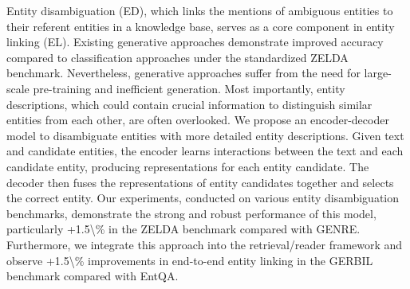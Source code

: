 Entity disambiguation (ED), which links the mentions of ambiguous entities to their referent entities in a knowledge base, serves as a core component in entity linking (EL). Existing generative approaches demonstrate improved accuracy compared to classification approaches under the standardized ZELDA benchmark. Nevertheless, generative approaches suffer from the need for large-scale pre-training and inefficient generation. Most importantly, entity descriptions, which could contain crucial information to  distinguish similar entities from each other, are often overlooked. We propose an encoder-decoder model to disambiguate entities with more detailed entity descriptions. Given text and candidate entities, the encoder learns interactions between the text and each candidate entity, producing representations for each entity candidate. The decoder then fuses the representations of entity candidates together and selects the correct entity. Our experiments, conducted on various entity disambiguation benchmarks, demonstrate the strong and robust performance of this model, particularly +1.5\textbackslash{}\% in the ZELDA benchmark compared with GENRE. Furthermore, we integrate this approach into the retrieval/reader framework and observe +1.5\textbackslash{}\% improvements in end-to-end entity linking in the GERBIL benchmark compared with EntQA.